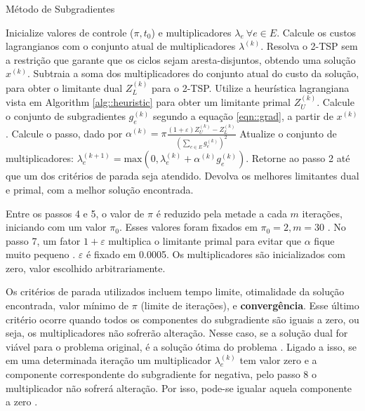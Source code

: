 \documentclass{TEMA}
\begin{document}
\begin{algorithm}[H]
    \label{alg::subgradient}
    \caption{Método de Subgradientes}
    \begin{algorithmic}[1]
        \STATE Inicialize valores de controle ($\pi, t_0$) e multiplicadores $\lambda_e~\forall e \in E$.
        \STATE Calcule os custos lagrangianos com o conjunto atual de multiplicadores $\lambda^{(k)}$.
        \STATE Resolva o 2-TSP sem a restrição que garante que os ciclos sejam aresta-disjuntos, obtendo uma solução $x^{(k)}$.
        \STATE Subtraia a soma dos multiplicadores do conjunto atual do custo da solução, para obter o limitante dual $Z_{L}^{(k)}$ para o 2-TSP.
        \STATE Utilize a heurística lagrangiana vista em Algorithm \ref{alg::heuristic} para obter um limitante primal $Z_{U}^{(k)}$.
        \STATE Calcule o conjunto de subgradientes $g_e^{(k)}$ segundo a equação \eqref{eqn::grad}, a partir de $x^{(k)}$.
        \STATE Calcule o passo, dado por $\alpha^{(k)} = \pi\frac{(1+\varepsilon)Z_{U}^{(k)} - Z_{L}^{(k)}}{(\sum_{e \in E} g_e^{(k)})^2}$
        \STATE Atualize o conjunto de multiplicadores: $\lambda_e^{(k+1)} = \text{max}(0, \lambda_e^{(k)} + \alpha^{(k)}g_e^{(k)})$.
        \STATE Retorne ao passo 2 até que um dos critérios de parada seja atendido.
        \STATE Devolva os melhores limitantes dual e primal, com a melhor solução encontrada.
    \end{algorithmic}
\end{algorithm}

Entre os passos 4 e 5, o valor de $\pi$ é reduzido pela metade a cada $m$ iterações, iniciando com um valor $\pi_0$. Esses valores foram fixados em $\pi_0=2, m=30$ \cite{beasley}. No passo 7, um fator $1+\varepsilon$ multiplica o limitante primal para evitar que $\alpha$ fique muito pequeno \cite{beasley}. $\varepsilon$ é fixado em 0.0005. Os multiplicadores são inicializados com zero, valor escolhido arbitrariamente.

Os critérios de parada utilizados incluem tempo limite, otimalidade da solução encontrada, valor mínimo de $\pi$ (limite de iterações), e \textbf{convergência}. Esse último critério ocorre quando todos os componentes do subgradiente são iguais a zero, ou seja, os multiplicadores não sofrerão alteração. Nesse caso, se a solução dual for viável para o problema original, é a solução ótima do problema \cite{beasley}. Ligado a isso, se em uma determinada iteração um multiplicador $\lambda_e^{(k)}$ tem valor zero e a componente correspondente do subgradiente for negativa, pelo passo 8 o multiplicador não sofrerá alteração. Por isso, pode-se igualar aquela componente a zero \cite{beasley}.
\end{document}
